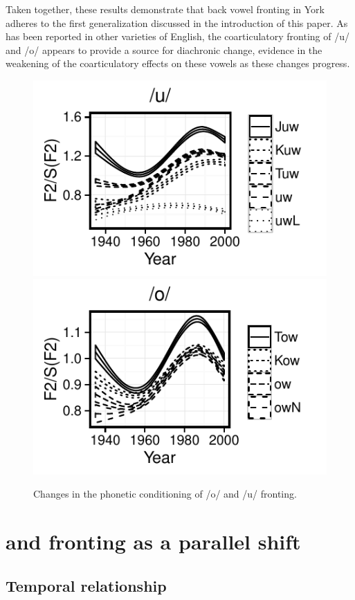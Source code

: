 \documentclass[12pt]{article}
\begin{document}
Taken together, these results demonstrate that back vowel fronting in York adheres to the first generalization discussed in the introduction of this paper. As has been reported in other varieties of English, the coarticulatory fronting of /u/ and /o/ appears to provide a source for diachronic change, evidence in the weakening of the coarticulatory effects on these vowels as these changes progress.  
\begin{figure}[!htbp]
\includegraphics{uwphoneticconditioning}
\includegraphics{owphoneticconditioning}
\caption{Changes in the phonetic conditioning of /o/ and /u/ fronting.}
\end{figure}

\section{ and  fronting as a parallel shift}
\subsection{Temporal relationship}
\end{document}
